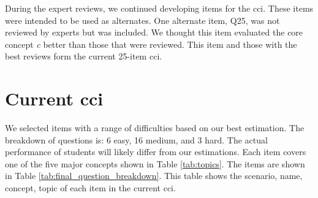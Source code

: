\iflong

During the expert reviews, we continued developing items for the \gls{cci}. These items were intended to be used as alternates. One alternate item, Q25, was not reviewed by experts but was included. We thought this item evaluated the core concept \textit{\gls{c}} better than those that were reviewed. This item and those with the best reviews form the current 25-item \gls{cci}.

\fi


\section{Current \gls{cci}}

We selected items with a range of difficulties based on our best estimation. The breakdown of questions is: 6 easy, 16 medium, and 3 hard. The actual performance of students will likely differ from our estimations. Each item covers one of the five major concepts shown in Table \ref{tab:topics}. \iflong The items are shown in Table \ref{tab:final_question_breakdown}. This table shows the scenario, name, concept, topic of each item in the current \gls{cci}.\fi 





\iflong
\begin{table}[!h]
\centering
\caption{Five Core Concepts of Cybersecurity}
\label{tab:topics}
\end{table}
\fi
\ifshort
\begin{table}[!h]
\centering
\caption{Five Core Concepts of Cybersecurity}
\label{tab:topics}
\end{table}
\fi





